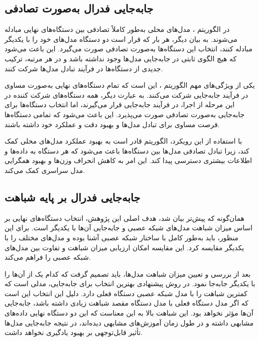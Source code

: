 \subsection{جابه‌جایی فدرال به‌صورت تصادفی}

در الگوریتم
%
، مدل‌های محلی به‌طور کاملاً تصادفی بین دستگاه‌های نهایی مبادله می‌شوند. به بیان دیگر، هر بار که قرار است دو دستگاه مدل‌های خود را با یکدیگر مبادله کنند، انتخاب این دستگاه‌ها به‌صورت تصادفی صورت می‌گیرد. این باعث می‌شود که هیچ الگوی ثابتی در جابه‌جایی مدل‌ها وجود نداشته باشد و در هر مرتبه، ترکیب جدیدی از دستگاه‌ها در فرآیند تبادل مدل‌ها شرکت کنند.


یکی از ویژگی‌های مهم الگوریتم
%
، این است که تمام دستگاه‌های نهایی به‌صورت مساوی در فرآیند جابه‌جایی شرکت می‌کنند. به عبارت دیگر، همه دستگاه‌های شرکت کننده در این مرحله از اجرا، در فرآیند جابه‌جایی قرار می‌گیرند، اما انتخاب دستگاه‌ها برای جابه‌جایی به‌صورت تصادفی صورت می‌پذیرد. این باعث می‌شود که تمامی دستگاه‌ها فرصت مساوی برای تبادل مدل‌ها و بهبود دقت و عملکرد خود داشته باشند.

با استفاده از این رویکرد، الگوریتم
قادر است به بهبود عملکرد مدل‌های محلی کمک کند، زیرا تبادل تصادفی مدل‌ها بین دستگاه‌ها باعث می‌شود که هر دستگاه به داده‌ها و اطلاعات بیشتری دسترسی پیدا کند. این امر به کاهش انحراف وزن‌ها و بهبود همگرایی مدل سراسری کمک می‌کند.


\subsection{
جابه‌جایی فدرال بر پایه شباهت%
}
همان‌گونه که پیش‌تر بیان شد، هدف اصلی این پژوهش، انتخاب دستگاه‌های نهایی بر اساس میزان شباهت مدل‌های شبکه عصبی و جابه‌جایی آن‌ها با یکدیگر است. برای این منظور، باید به‌طور کامل با ساختار شبکه عصبی آشنا بوده و مدل‌های مختلف را با یکدیگر مقایسه کرد. این مقایسه امکان ارزیابی میزان شباهت و تفاوت بین مدل‌های شبکه عصبی را فراهم می‌کند.

بعد از بررسی و تعیین میزان شباهت مدل‌ها، باید تصمیم گرفت که کدام یک از آن‌ها را با یکدیگر جابه‌جا نمود. در روش پیشنهادی
بهترین انتخاب برای جابه‌جایی، مدلی است که کمترین شباهت را با مدل شبکه عصبی دستگاه فعلی دارد. دلیل این انتخاب این است که اگر مدل دستگاه فعلی با مدل دستگاه مقصد شباهت زیادی داشته باشد، جابه‌جایی آن‌ها مؤثر نخواهد بود. این شباهت بالا به این معناست که این دو دستگاه نهایی داده‌های مشابهی داشته و در طول زمان آموزش‌های مشابهی دیده‌اند، در نتیجه جابه‌جایی مدل‌ها تأثیر قابل‌توجهی بر بهبود یادگیری نخواهد داشت.

